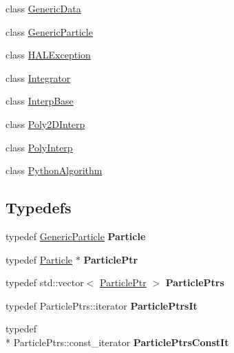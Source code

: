 \begin{DoxyCompactItemize}
class \hyperlink{class_h_a_l_1_1_generic_data}{Generic\+Data}
\item 
class \hyperlink{class_h_a_l_1_1_generic_particle}{Generic\+Particle}
\item 
class \hyperlink{class_h_a_l_1_1_h_a_l_exception}{H\+A\+L\+Exception}
\item 
class \hyperlink{class_h_a_l_1_1_integrator}{Integrator}
\item 
class \hyperlink{class_h_a_l_1_1_interp_base}{Interp\+Base}
\item 
class \hyperlink{class_h_a_l_1_1_poly2_d_interp}{Poly2\+D\+Interp}
\item 
class \hyperlink{class_h_a_l_1_1_poly_interp}{Poly\+Interp}
\item 
class \hyperlink{class_h_a_l_1_1_python_algorithm}{Python\+Algorithm}
\end{DoxyCompactItemize}
\subsection*{Typedefs}
\begin{DoxyCompactItemize}
\item 
\hypertarget{namespace_h_a_l_a8e90b3570f12960529bfa31c5f4975ee}{typedef \hyperlink{class_h_a_l_1_1_generic_particle}{Generic\+Particle} {\bfseries Particle}}\label{namespace_h_a_l_a8e90b3570f12960529bfa31c5f4975ee}

\item 
\hypertarget{namespace_h_a_l_af40898da7d6a44a415de9012b3764210}{typedef \hyperlink{class_h_a_l_1_1_generic_particle}{Particle} $\ast$ {\bfseries Particle\+Ptr}}\label{namespace_h_a_l_af40898da7d6a44a415de9012b3764210}

\item 
\hypertarget{namespace_h_a_l_a775ef811d38552a0ee603d80b77da9ab}{typedef std\+::vector$<$ \hyperlink{class_h_a_l_1_1_generic_particle}{Particle\+Ptr} $>$ {\bfseries Particle\+Ptrs}}\label{namespace_h_a_l_a775ef811d38552a0ee603d80b77da9ab}

\item 
\hypertarget{namespace_h_a_l_acea038eb6c89dbf396060ed07b79059e}{typedef Particle\+Ptrs\+::iterator {\bfseries Particle\+Ptrs\+It}}\label{namespace_h_a_l_acea038eb6c89dbf396060ed07b79059e}

\item 
\hypertarget{namespace_h_a_l_a86a0d42ec6c4857f7f83138fe1dff490}{typedef \\*
Particle\+Ptrs\+::const\+\_\+iterator {\bfseries Particle\+Ptrs\+Const\+It}}\label{namespace_h_a_l_a86a0d42ec6c4857f7f83138fe1dff490}

\end{DoxyCompactItemize}
